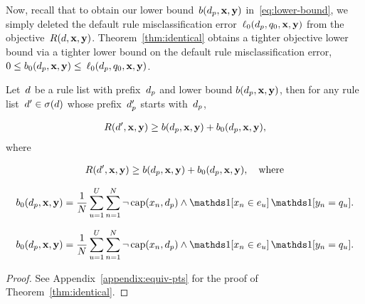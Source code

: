 Now, recall that to obtain our lower bound~${b(d_p, \mathbf{x}, \mathbf{y})}$
in~\eqref{eq:lower-bound}, we simply deleted the
default rule misclassification error~$\ell_0(d_p, q_0, \mathbf{x}, \mathbf{y})$
from the objective~${R({d}, \mathbf{x}, \mathbf{y})}$.
%
Theorem~\ref{thm:identical} obtains a tighter objective lower bound
via a tighter lower bound on the default rule misclassification error,
${0 \le b_0(d_p, \mathbf{x}, \mathbf{y}) \le}$ $\ell_0(d_p, q_0, \mathbf{x}, \mathbf{y})$.

\begin{theorem}
\label{thm:identical}
Let~${d}$ be a rule list with prefix~$d_p$
and lower bound ${b(d_p, \mathbf{x}, \mathbf{y})}$,
then for any rule list~${{d}' \in \sigma({d})}$
whose prefix~$d_p'$ starts with~$d_p$,
\begin{arxiv}
\begin{align}
R({d}', \mathbf{x}, \mathbf{y}) \ge b(d_p, \mathbf{x}, \mathbf{y}) + b_0(d_p, \mathbf{x}, \mathbf{y}),
\label{eq:identical}
\end{align}
where
\end{arxiv}
\begin{kdd}
\begin{align}
R({d}', \mathbf{x}, \mathbf{y}) \ge b(d_p, \mathbf{x}, \mathbf{y}) + b_0(d_p, \mathbf{x}, \mathbf{y}), \quad \text{where}
\end{align}
\end{kdd}
\begin{arxiv}
\begin{align}
b_0(\Prefix, \x, \y) = \frac{1}{N} \sum_{u=1}^U \sum_{n=1}^N
    \neg\, \Cap(x_n, \Prefix) \wedge \one [ x_n \in e_u ]\, \one [ y_n = q_u ].
\label{eq:lb-b0}
\end{align}
\end{arxiv}
\begin{kdd}
\begin{align}
b_0(\Prefix, \x, \y) = \frac{1}{N} \sum_{u=1}^U \sum_{n=1}^N
    \neg\, \Cap(x_n, \Prefix) \wedge \one [ x_n \in e_u ]\, \one [ y_n = q_u ]. \nn
\end{align}
\end{kdd}
\end{theorem}

\begin{arxiv}
\begin{proof}
See Appendix~\ref{appendix:equiv-pts} for the proof of Theorem~\ref{thm:identical}.
\end{proof}
\end{arxiv}
